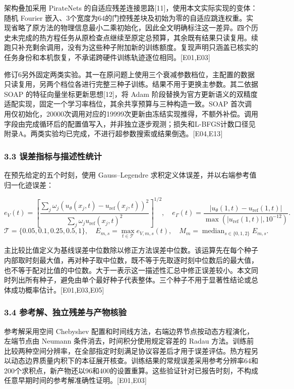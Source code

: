 \documentclass[11pt,a4paper]{article}
\begin{document}
架构叠加采用 PirateNets 的自适应残差连接思路{[}11{]}，使用本文实际实现的变体：随机 Fourier 嵌入、3个宽度为64的门控残差块及初始为零的自适应跳连权重。实现省略了原方法的物理信息最小二乘初始化，因此全文明确标注这一差异。四个历史未完成的热方程任务从原检查点继续至原定总预算，其余既有结果只读复用。续跑只补充剩余调用，没有为这些种子附加新的训练额度。复现声明只涵盖已核实的任务身份和本机恢复，不承诺跨硬件训练轨迹逐位相同。{[}E01,E03{]}

修订6另外固定两类实验。其一在原问题上使用三个衰减参数档位，主配置的数据只读复用，另两个档位各进行完整三种子训练。结果不用于更换主参数。其二依据 SOAP 的特征向量坐标更新思想{[}12{]}，将 Adam 阶段替换为官方更新语义的双精度适配实现，固定一个学习率档位，其余共享预算与三种构造一致。SOAP 首次调用仅初始化，20000次调用对应的19999次更新由冻结实现推得，不额外补偿。调用字段由完成循环后的配置值写入，并非独立逐步观测；损失和L-BFGS计数口径见附录A。两类实验均已完成，不进行超参数搜索或结果倒选。{[}E04,E13{]}

\subsubsection{3.3 误差指标与描述性统计}\label{ux8befux5deeux6307ux6807ux4e0eux63cfux8ff0ux6027ux7edfux8ba1}

在预先给定的五个时刻，使用 Gauss--Legendre 求积定义体误差，并以右端参考值归一化迹误差：

\[
e_V(t)=\left[\frac{\sum_j\omega_j(u_\theta(x_j,t)-u_{\mathrm{ref}}(x_j,t))^2}{\sum_j\omega_j u_{\mathrm{ref}}(x_j,t)^2}\right]^{1/2},
\quad e_\Gamma(t)=\frac{|u_\theta(1,t)-u_{\mathrm{ref}}(1,t)|}{\max(|u_{\mathrm{ref}}(1,t)|,10^{-12})}.
\tag{15}
\] \[
\mathcal T=\{0.05,0.1,0.25,0.5,1\},\quad
E_{m,s}=\max_{t\in\mathcal T}e_{V,m,s}(t),\quad
M_m=\operatorname{median}_{s\in\{0,1,2\}}E_{m,s}.
\tag{16}
\]

主比较比值定义为基线误差中位数除以修正方法误差中位数。该运算先在每个种子内部取时刻最大值，再对种子取中位数，既不等于先取逐时刻中位数后的最大值，也不等于配对比值的中位数。大于一表示这一描述性汇总中修正误差较小。本文同时列出所有种子，避免由单个最好种子代表整体。三个种子不用于显著性结论或总体成功概率估计。{[}E01,E03,E05{]}

\subsubsection{3.4 参考解、独立残差与产物核验}\label{ux53c2ux8003ux89e3ux72ecux7acbux6b8bux5deeux4e0eux4ea7ux7269ux6838ux9a8c}

参考解采用空间 Chebyshev 配置和时间线方法，右端边界节点按动态方程演化，左端节点由 Neumann 条件消去，时间积分使用规定容差的 Radau 方法。训练前比较两种空间分辨率，在全部指定时刻满足协议容差后才用于误差评估。热方程另以动态边界质量内积下的本征展开核查。训练结果的常规误差采用参考分辨率64和200个求积点，新产物还以96和400的设置重算。这些验证针对已报告时刻，不构成任意早期时间的参考解准确性证明。{[}E01,E03{]}
\end{document}
